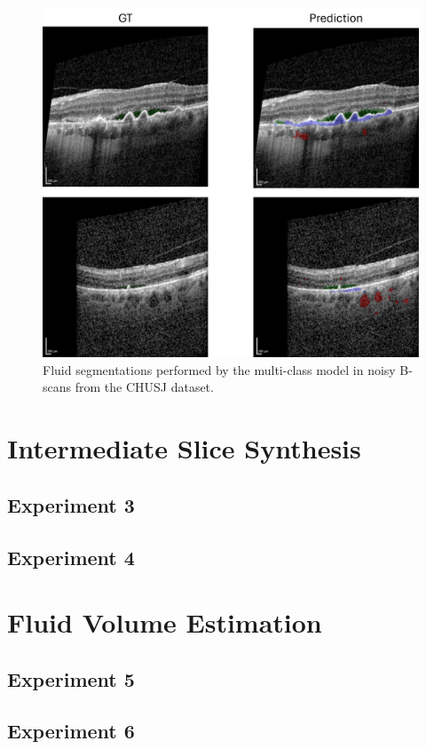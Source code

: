 \begin{figure}[!ht]
	\centering	\includegraphics[width=0.9\linewidth]{figures/CHUSJSegmentationOnNoisyScans.png}
	\caption{Fluid segmentations performed by the multi-class model in noisy B-scans from the CHUSJ dataset.}
	\label{fig:CHUSJSegmentationOnNoisyScans}
\end{figure}

\section{Intermediate Slice Synthesis}\label{IntermediateSliceSynthesis}

\subsection{Experiment 3}

\subsection{Experiment 4}

\section{Fluid Volume Estimation}\label{FluidVolumeEstimation}

\subsection{Experiment 5}

\subsection{Experiment 6}